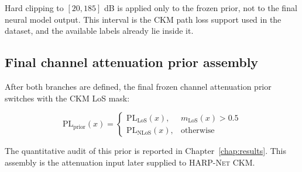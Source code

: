 Hard clipping to $[20, 185]$ dB is applied only to the frozen prior, not to the
final neural model output. This interval is the CKM path loss support used in
the dataset, and the available labels already lie inside it.

\subsection{Final channel attenuation prior assembly}

After both branches are defined, the final frozen channel attenuation prior
switches with the CKM LoS mask:

\begin{equation}
\mathrm{PL}_{\mathrm{prior}}(x)
=
\begin{cases}
\mathrm{PL}_{\mathrm{LoS}}(x), & m_{\mathrm{LoS}}(x) > 0.5 \\
\mathrm{PL}_{\mathrm{NLoS}}(x), & \text{otherwise}
\end{cases}
\label{eq:pl_hybrid}
\end{equation}

The quantitative audit of this prior is reported in Chapter~\ref{chap:results}.
This assembly is the attenuation input later supplied to \textsc{HARP-Net CKM}.

